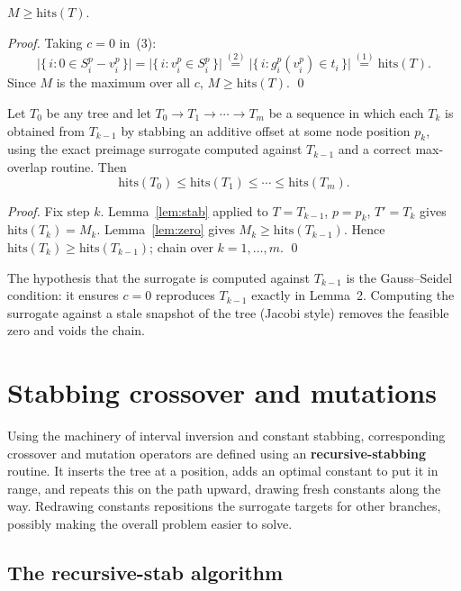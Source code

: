 \documentclass{llncs}
\begin{document}
\begin{lemma}
\label{lem:zero}
$M \ge \mathrm{hits}(T)$.
\end{lemma}
\begin{proof}
Taking $c=0$ in~(3):
\[
  \bigl|\{\, i : 0 \in S_i^p - v_i^p \,\}\bigr|
  = \bigl|\{\, i : v_i^p \in S_i^p \,\}\bigr|
  \overset{(2)}{=} \bigl|\{\, i : g_i^p(v_i^p)\in t_i \,\}\bigr|
  \overset{(1)}{=} \mathrm{hits}(T).
\]
Since $M$ is the maximum over all $c$, $M \ge \mathrm{hits}(T)$. \qed
\end{proof}

\begin{theorem}
\label{thm:monotone}
Let $T_0$ be any tree and let $T_0 \to T_1 \to \cdots \to T_m$ be a sequence in
which each $T_k$ is obtained from $T_{k-1}$ by stabbing an additive offset at some
node position $p_k$, using the exact preimage surrogate computed against $T_{k-1}$
and a correct max-overlap routine. Then
\[
  \mathrm{hits}(T_0) \le \mathrm{hits}(T_1) \le \cdots \le \mathrm{hits}(T_m).
\]
\end{theorem}
\begin{proof}
Fix step $k$. Lemma~\ref{lem:stab} applied to $T=T_{k-1}$, $p=p_k$, $T'=T_k$ gives
$\mathrm{hits}(T_k)=M_k$. Lemma~\ref{lem:zero} gives $M_k \ge \mathrm{hits}(T_{k-1})$.
Hence $\mathrm{hits}(T_k)\ge\mathrm{hits}(T_{k-1})$; chain over $k=1,\dots,m$. \qed
\end{proof}

The hypothesis that the surrogate is computed against $T_{k-1}$ is the Gauss--Seidel
condition: it ensures $c=0$ reproduces $T_{k-1}$ exactly in Lemma~2. Computing the
surrogate against a stale snapshot of the tree (Jacobi style) removes the feasible
zero and voids the chain.


\section{Stabbing crossover and mutations}

Using the machinery of interval inversion and constant stabbing, corresponding crossover and mutation operators are defined using an {\bf recursive-stabbing} routine. It inserts the tree at a position, adds an optimal constant to put it in range, and repeats this on the path upward, drawing fresh constants along the way. Redrawing constants repositions the surrogate targets for other branches, possibly making the overall problem easier to solve. 

\subsection{The recursive-stab algorithm}
\end{document}
